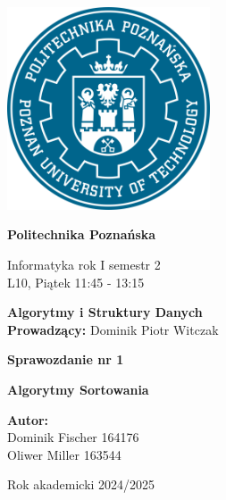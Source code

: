 \documentclass{article}
\begin{document}
	
	
	\thispagestyle{empty} %
	
	\begin{center}
		\includegraphics[width=6cm]{Image/PP-PUT-LOGO.png}
		\vspace{1cm}
		
		{\Huge\bfseries Politechnika Poznańska}
		
		\vspace{1cm}
		
		{\large Informatyka rok I semestr 2} \\[0.3cm]
		L10, Piątek 11:45 - 13:15
		
		\vspace{1.5cm}
		
		{\LARGE\bfseries Algorytmy i Struktury Danych} \\[0.3cm]
		\textbf{Prowadzący:} Dominik Piotr Witczak
		
		\vspace{2cm}
		
		{\LARGE\bfseries Sprawozdanie nr 1} 
		
		\vspace{1cm}
		
		{\Large\bfseries Algorytmy Sortowania}
		
		\vspace{3cm}
		
		\begin{flushright}
			\textbf{Autor:} \\[0.2cm]
			Dominik Fischer 164176 \\
			Oliwer Miller 163544
		\end{flushright}
		
		\vspace{2cm}
		Rok akademicki 2024/2025
	\end{center}
	
\end{document}
